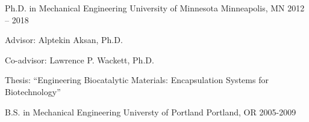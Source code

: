 


\begin{cventries}


\cventry
{Ph.D. in Mechanical Engineering} %
{University of Minnesota} %
{Minneapolis, MN} %
{2012 – 2018} %
{ %
\begin{cvitems}
\item {Advisor: Alptekin Aksan, Ph.D.}
\item{Co-advisor: Lawrence P. Wackett, Ph.D.}
\item{Thesis: “Engineering Biocatalytic Materials: Encapsulation Systems for Biotechnology”
}
\end{cvitems}
}

\cventry
{B.S. in Mechanical Engineering}
{Universty of Portland}
{Portland, OR}
{2005-2009}
{
\begin{cvitems}
\end{cvitems}
}

\end{cventries}